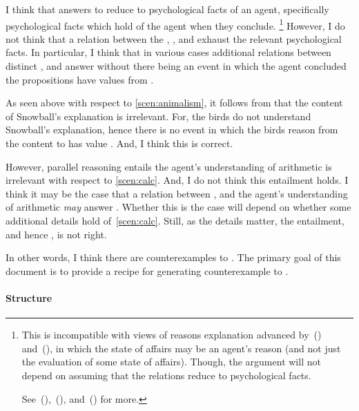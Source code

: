 \begin{note}
  I think that answers to \qWhy{} reduce to psychological facts of an agent, specifically psychological facts which hold of the agent when they conclude.%
  \footnote{
    This is incompatible with views of reasons explanation advanced by~(\cite{Dancy:2000aa}) and~(\cite{Alvarez:2013aa}), in which the state of affairs may be an agent's reason (and not just the evaluation of some state of affairs).
    Though, the argument will not depend on assuming that the relations reduce to psychological facts.

    See~(\cite[413--418]{Hieronymi:2011aa}),~(\cite[3--5]{DOro:2013vh}), and~(\cite[\S2]{Alvarez:2017aa}) for more.
  }
  However, I do not think that a relation between the , , and \pool{} exhaust the relevant psychological facts.
  In particular, I think that in various cases additional relations between distinct ,  and  answer \qWhy{} without there being an event in which the agent concluded the propositions have values from .
\end{note}

\begin{note}
  As seen above with respect to \autoref{scen:animalism}, it follows from \issueInclusion{} that the content of Snowball's explanation is irrelevant.
  For, the birds do not understand Snowball's explanation, hence there is no event in which the birds reason from the content to  has value .
  And, I think this is correct.

  However, parallel reasoning entails the agent's understanding of arithmetic is irrelevant with respect to \autoref{scen:calc}.
  And, I do not think this entailment holds.
  I think it may be the case that a relation between \propM{\gistCalcEq{}},  and the agent's understanding of arithmetic \emph{may} answer \qWhy{}.
  Whether this is the case will depend on whether some additional details hold of~\autoref{scen:calc}.
  Still, as the details matter, the entailment, and hence \issueInclusion{}, is not right.
\end{note}

\begin{note}
  In other words, I think there are counterexamples to \issueInclusion{}.
  The primary goal of this document is to provide a recipe for generating counterexample to \issueInclusion{}.
\end{note}

\paragraph*{Structure}

